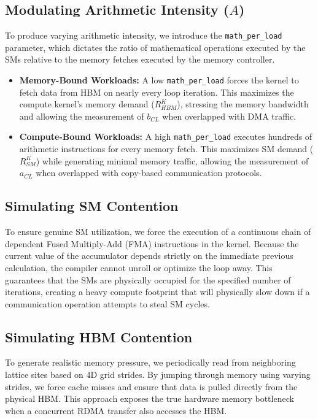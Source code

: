 \documentclass[twocolumn, secnumarabic, amssymb, nobibnotes, aps, prd, amsmath, nofootinbib]{revtex4-2}
\begin{document}
\subsection{Modulating Arithmetic Intensity ($A$)}
To produce varying arithmetic intensity, we introduce the \texttt{math\_per\_load} parameter, which dictates the ratio of mathematical operations executed by the SMs relative to the memory fetches executed by the memory controller.
\begin{itemize}
    \item \textbf{Memory-Bound Workloads:} A low \texttt{math\_per\_load} forces the kernel to fetch data from HBM on nearly every loop iteration. This maximizes the compute kernel's memory demand ($R_{HBM}^K$), stressing the memory bandwidth and allowing the measurement of $b_{CL}$ when overlapped with DMA traffic.
    \item \textbf{Compute-Bound Workloads:} A high \texttt{math\_per\_load} executes hundreds of arithmetic instructions for every memory fetch. This maximizes SM demand ($R_{SM}^K$) while generating minimal memory traffic, allowing the measurement of $a_{CL}$ when overlapped with copy-based communication protocols.
\end{itemize}

\subsection{Simulating SM Contention}
To ensure genuine SM utilization, we force the execution of a continuous chain of dependent Fused Multiply-Add (FMA) instructions in the kernel. Because the current value of the accumulator depends strictly on the immediate previous calculation, the compiler cannot unroll or optimize the loop away. This guarantees that the SMs are physically occupied for the specified number of iterations, creating a heavy compute footprint that will physically slow down if a communication operation attempts to steal SM cycles.

\subsection{Simulating HBM Contention}
To generate realistic memory pressure, we periodically read from neighboring lattice sites based on 4D grid strides. By jumping through memory using varying strides, we force cache misses and ensure that data is pulled directly from the physical HBM. This approach exposes the true hardware memory bottleneck when a concurrent RDMA transfer also accesses the HBM.
\end{document}
